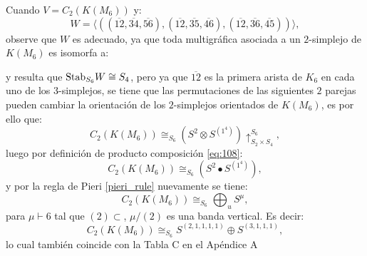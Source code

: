 \documentclass[12pt]{book}
\theoremstyle{definition}
\newcounter{in}
\newcounter{ini}
\begin{document}
Cuando $V = C_{2}(K(M_{6}))$ y:
\begin{equation}
W = \langle( (\overline{12},\overline{34},\overline{56}),(\overline{12},\overline{35},\overline{46}),(\overline{12},\overline{36},\overline{45})) \rangle,
\end{equation}
observe que $W$ es adecuado, ya que toda multigráfica asociada a un $2$-simplejo de $K(M_{6})$ es isomorfa a:
\begin{center}
\end{center}
y resulta que $\textup{Stab}_{S_{6}} W \cong S_{4}$, pero ya que
$\overline{12}$ es la primera arista de $K_{6}$ en cada uno de los
$3$-simplejos, se tiene que las permutaciones de las siguientes $2$
parejas pueden cambiar la orientación de los $2$-simplejos orientados de $K(M_{6})$, es por ello
que:
\begin{equation}
C_{2}(K(M_{6}))  \cong_{S_{6}} (S^{2} \otimes S^{(1^{4})}) \uparrow_{S_{2} \times S_{4}}^{S_{6}},
\end{equation}
luego por definición de producto composición \ref{eq:108}:
\begin{equation}
C_{2}(K(M_{6}))  \cong_{S_{6}} (S^{2} \bullet S^{(1^{4})}),
\end{equation}
y por la regla de Pieri \ref{pieri_rule} nuevamente se tiene:
\begin{equation}
C_{2}(K(M_{6})) \cong_{S_{6}} \bigoplus_{u} S^{\mu}, 
\end{equation}
para $\mu \vdash 6$ tal que $(2) \subset $, $\mu / (2)$ es una banda vertical. Es decir:
\begin{equation}
C_{2}(K(M_{6})) \cong_{S_{6}} S^{(2,1,1,1,1)} \oplus S^{(3,1,1,1)},
\end{equation}
lo cual también coincide con la Tabla C en el Apéndice A 
\end{document}
